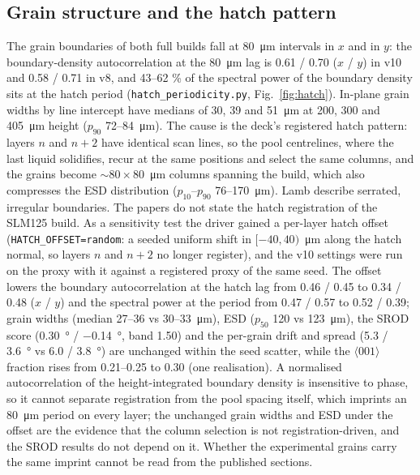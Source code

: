 \documentclass[11pt,a4paper]{article}
\newcommand{\code}[1]{\texttt{#1}}
\newcommand{\dir}[1]{$\langle #1 \rangle$}
\begin{document}
\subsection{Grain structure and the hatch pattern}
\label{sec:hatch}
The grain boundaries of both full builds fall at \SI{80}{\micro\metre} intervals in $x$ and in $y$: the boundary-density autocorrelation at the \SI{80}{\micro\metre} lag is 0.61 / 0.70 ($x$ / $y$) in v10 and 0.58 / 0.71 in v8, and 43--62 \% of the spectral power of the boundary density sits at the hatch period (\code{hatch\_periodicity.py}, Fig.~\ref{fig:hatch}). In-plane grain widths by line intercept have medians of 30, 39 and \SI{51}{\micro\metre} at 200, 300 and \SI{405}{\micro\metre} height ($p_{90}$ 72--\SI{84}{\micro\metre}). The cause is the deck's registered hatch pattern: layers $n$ and $n+2$ have identical scan lines, so the pool centrelines, where the last liquid solidifies, recur at the same positions and select the same columns, and the grains become $\sim 80 \times 80$~\si{\micro\metre} columns spanning the build, which also compresses the ESD distribution ($p_{10}$--$p_{90}$ 76--\SI{170}{\micro\metre}). Lamb describe serrated, irregular boundaries. The papers do not state the hatch registration of the SLM125 build. As a sensitivity test the driver gained a per-layer hatch offset (\code{HATCH\_OFFSET=random}: a seeded uniform shift in $[-40, 40)$~\si{\micro\metre} along the hatch normal, so layers $n$ and $n+2$ no longer register), and the v10 settings were run on the proxy with it against a registered proxy of the same seed. The offset lowers the boundary autocorrelation at the hatch lag from 0.46 / 0.45 to 0.34 / 0.48 ($x$ / $y$) and the spectral power at the period from 0.47 / 0.57 to 0.52 / 0.39; grain widths (median 27--36 vs 30--33~\si{\micro\metre}), ESD ($p_{50}$ 120 vs \SI{123}{\micro\metre}), the SROD score (\SI{0.30}{\degree} / \SI{-0.14}{\degree}, band 1.50) and the per-grain drift and spread (5.3 / \SI{3.6}{\degree} vs 6.0 / \SI{3.8}{\degree}) are unchanged within the seed scatter, while the \dir{001} fraction rises from 0.21--0.25 to 0.30 (one realisation). A normalised autocorrelation of the height-integrated boundary density is insensitive to phase, so it cannot separate registration from the pool spacing itself, which imprints an \SI{80}{\micro\metre} period on every layer; the unchanged grain widths and ESD under the offset are the evidence that the column selection is not registration-driven, and the SROD results do not depend on it. Whether the experimental grains carry the same imprint cannot be read from the published sections.
\end{document}
